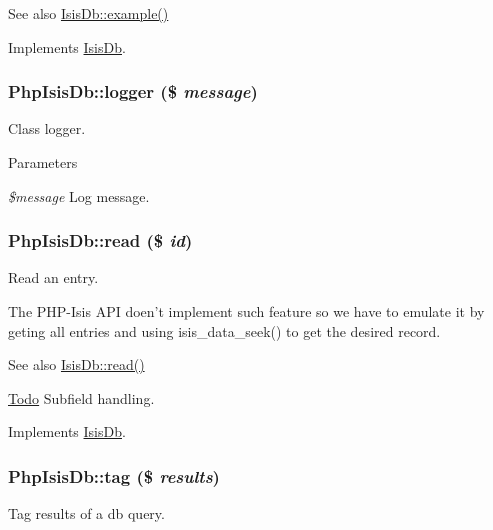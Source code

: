 \begin{DoxySeeAlso}{See also}
\hyperlink{interfaceIsisDb_a857c10d90da64067efa17afb2f32edb6}{IsisDb::example()} 
\end{DoxySeeAlso}


Implements \hyperlink{interfaceIsisDb_a857c10d90da64067efa17afb2f32edb6}{IsisDb}.

\hypertarget{classPhpIsisDb_a8d8185060a26d4fe673844b2ea3db39a}{
\subsubsection[{logger}]{\setlength{\rightskip}{0pt plus 5cm}PhpIsisDb::logger (\$ {\em message})}}
\label{classPhpIsisDb_a8d8185060a26d4fe673844b2ea3db39a}
Class logger.


\begin{DoxyParams}{Parameters}
\item[{\em \$message}]Log message. \end{DoxyParams}
\hypertarget{classPhpIsisDb_af2266931746f6f2335b831be8b8333fb}{
\subsubsection[{read}]{\setlength{\rightskip}{0pt plus 5cm}PhpIsisDb::read (\$ {\em id})}}
\label{classPhpIsisDb_af2266931746f6f2335b831be8b8333fb}
Read an entry.

The PHP-\/Isis API doen't implement such feature so we have to emulate it by geting all entries and using isis\_\-data\_\-seek() to get the desired record.

\begin{DoxySeeAlso}{See also}
\hyperlink{interfaceIsisDb_a68335ec0db01ef03f0725621b38b5686}{IsisDb::read()}
\end{DoxySeeAlso}
\begin{Desc}
\item[\hyperlink{todo__todo000003}{Todo}]Subfield handling. \end{Desc}


Implements \hyperlink{interfaceIsisDb_a68335ec0db01ef03f0725621b38b5686}{IsisDb}.

\hypertarget{classPhpIsisDb_a849f238c3323f53431be1c225a914d98}{
\subsubsection[{tag}]{\setlength{\rightskip}{0pt plus 5cm}PhpIsisDb::tag (\$ {\em results})}}
\label{classPhpIsisDb_a849f238c3323f53431be1c225a914d98}
Tag results of a db query.

